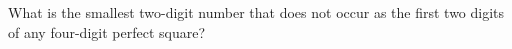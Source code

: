 What is the smallest two-digit number that does not occur as the first two digits of any four-digit perfect square?
